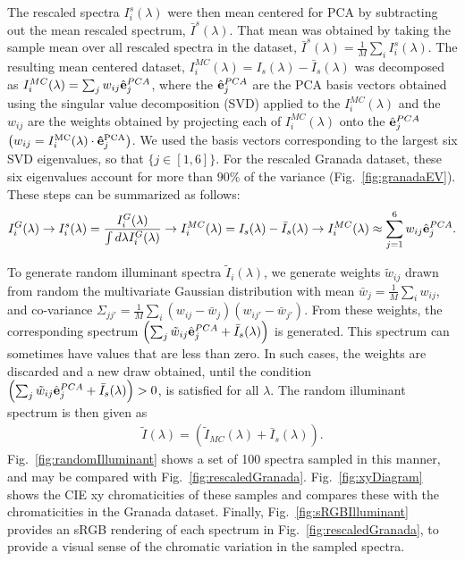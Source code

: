 \documentclass{jov}
\begin{document}
The rescaled spectra $I_i^s(\lambda)$ were then mean centered for PCA by subtracting out the mean 
rescaled spectrum, $\bar{I}^{s}(\lambda)$. That mean was obtained
by taking the sample mean over all rescaled spectra in the dataset, $\bar{I}^{s}(\lambda) = \frac{1}{M}\sum_i{I_i^s(\lambda)}$. 
The resulting mean centered dataset, $I_i^{MC}(\lambda) = I_{s}(\lambda) - \bar{I}_{s}(\lambda)$
was decomposed as $I_i^{MC}(\lambda) = \sum_j w_{ij}\hat{{\bf e}}_j^{PCA}$, 
where the $\hat{{\bf e}}_j^{PCA}$ are the PCA basis vectors obtained using the
singular value decomposition (SVD) applied to the $I_i^{MC}(\lambda)$ and
the $w_{ij}$ are the weights obtained by projecting each of $I_i^{MC}(\lambda)$ onto the  $\hat{{\bf e}}_j^{PCA}$ $\left( w_{ij} = I_i^{\rm MC}(\lambda)\cdot {\bf \hat{e}}_j^{\rm PCA}\right)$.
We used the basis vectors corresponding to
the largest six SVD eigenvalues, so that $\{j \in [1,6]\}$.
For the rescaled Granada dataset, these six  eigenvalues account for more than $90\%$ of the variance (Fig.~\ref{fig:granadaEV}).
These steps
can be summarized as follows:
\begin{align}
I^G_i(\lambda) \rightarrow I_i^s(\lambda) = \frac{I^G_i(\lambda)}{\int d\lambda I^G_i(\lambda)} \rightarrow I_i^{MC}(\lambda) = I_{s}(\lambda) - \bar{I}_{s}(\lambda) \rightarrow I_i^{MC}(\lambda) \approx \sum_{j = 1}^6 w_{ij}\hat{{\bf e}}_j^{PCA}.
\end{align}

To generate random illuminant spectra $\tilde{I}_i(\lambda)$, we generate weights $\tilde{w}_{ij}$ drawn from random 
the multivariate 
Gaussian distribution with mean $\bar{w}_j = \frac{1}{M}\sum_i w_{ij}$, 
and co-variance $\Sigma_{jj'} = \frac{1}{M} \sum_i \left(w_{ij} -\bar{w}_j\right)\left(w_{ij'} -\bar{w}_{j'}\right) $.
From these weights, the corresponding spectrum $\left( \sum_j \tilde{w}_{ij} \hat{{\bf e}}_j^{PCA} +  \bar{I}_{s} (\lambda)\right)$ is generated.
This spectrum can sometimes have values that are less than zero.  In such cases, the weights are discarded and a new draw obtained, until
the condition $\left( \sum_j \tilde{w}_{ij} \hat{{\bf e}}_j^{PCA} +  \bar{I}_{s} (\lambda)\right) > 0$, is satisfied for all $\lambda$.
The random illuminant spectrum is then given as
\begin{align}
\tilde{I}(\lambda) = \left( \tilde{I}_{MC}(\lambda) + \bar{I}_{s}(\lambda)\right).
\end{align}
Fig.~\ref{fig:randomIlluminant} shows a set of 100 spectra sampled in this manner, and may be compared with Fig.~\ref{fig:rescaledGranada}.  Fig.~\ref{fig:xyDiagram} shows the CIE xy chromaticities of these samples and compares these with the chromaticities in the Granada dataset.  Finally, Fig.~\ref{fig:sRGBIlluminant} provides an sRGB rendering of each spectrum in Fig.~\ref{fig:rescaledGranada}, to provide a visual sense of the chromatic variation in the sampled spectra.
\end{document}
